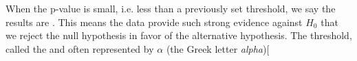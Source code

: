 %
%
%
%
%

When the p-value is small, i.e. less than a previously set threshold, we say the results are . This means the data provide such strong evidence against $H_0$ that we reject the null hypothesis in favor of the alternative hypothesis. The threshold, called the  and often represented by $\alpha$ (the Greek letter \emph{alpha}\label{alphadiscussion})\marginpar[\raggedright\vspace{-4mm}

